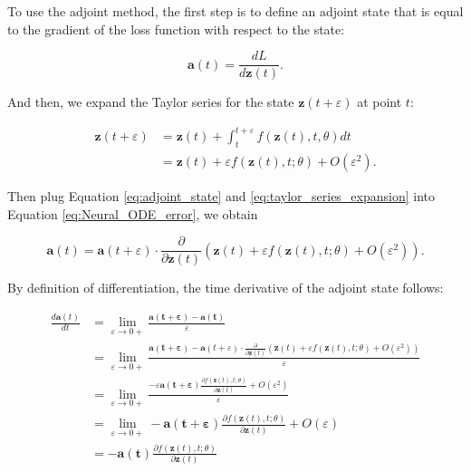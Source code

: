 \documentclass[
	parskip, 			   %
	twoside, 			   %
	DIV=14, 			   %
	BCOR=15.0mm, 		   %
	headsepline, 		   %
	open=right, 		   %
	captions=tableheading, %
	bibliography=totoc,    %
	numbers=noenddot       %
]{scrreprt}
\begin{document}
To use the adjoint method, the first step is to define an adjoint state that is equal to the gradient of the loss function with respect to the state:

\begin{equation}
    \label{eq:adjoint_state}
    \mathbf{a}(t) = \frac{d L}{d\mathbf{z}(t)}.
\end{equation}

And then, we expand the Taylor series for the state $\mathbf{z}(t+\varepsilon )$ at point $t$:

\begin{equation}
    \label{eq:taylor_series_expansion}
    \begin{aligned}
    \mathbf{z}(t+\varepsilon ) &= \mathbf{z}(t) + \int_{t}^{t+\varepsilon } f(\mathbf{z}(t), t, \theta)dt\\
    &= \mathbf{z}(t) + \varepsilon f(\mathbf{z}(t), t; \theta) + O (\varepsilon ^2).
    \end{aligned}
\end{equation}

Then plug Equation \ref{eq:adjoint_state} and \ref{eq:taylor_series_expansion} into Equation \ref{eq:Neural_ODE_error}, we obtain

\begin{equation}
    \label{eq:Neural_ODE_adjoint_state}
    \mathbf{a}(t) = \mathbf{a}(t+\varepsilon ) \cdot \frac{\partial}{\partial \mathbf{z}(t)} (\mathbf{z}(t) + \varepsilon f(\mathbf{z}(t), t; \theta) + O (\varepsilon ^2)) .
\end{equation}

By definition of differentiation, the time derivative of the adjoint state follows:

\begin{equation}
    \label{eq:adjoint_state_gradient_hidden_state}
    \begin{aligned}
        \frac{d\mathbf{a}(t)}{dt} &= \lim_{\varepsilon \to 0+} \frac{\mathbf{a(t+\varepsilon)}-\mathbf{a(t)}}{\varepsilon} \\
        &= \lim_{\varepsilon \to 0+} \frac{\mathbf{a(t+\varepsilon)}-\mathbf{a}(t+\varepsilon ) \cdot \frac{\partial}{\partial \mathbf{z}(t)} (\mathbf{z}(t) + \varepsilon f(\mathbf{z}(t), t; \theta) + O (\varepsilon ^2)) }{\varepsilon}\\
        &= \lim_{\varepsilon \to 0+} \frac{-\varepsilon \mathbf{a(t+\varepsilon)} \frac{\partial f(\mathbf{z}(t), t; \theta)}{\partial \mathbf{z}(t)} + O (\varepsilon ^2)}{\varepsilon}\\
        &= \lim_{\varepsilon \to 0+} - \mathbf{a(t+\varepsilon)} \frac{\partial f(\mathbf{z}(t), t; \theta)}{\partial \mathbf{z}(t)} + O (\varepsilon)\\
        &= - \mathbf{a(t)} \frac{\partial f(\mathbf{z}(t), t; \theta)}{\partial \mathbf{z}(t)}
    \end{aligned}
\end{equation}
\end{document}
